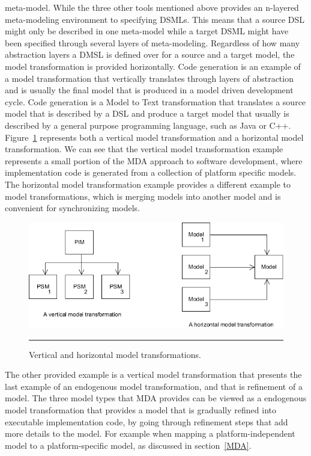 meta-model. While the three other tools mentioned above provides an n-layered
meta-modeling environment to specifying DSMLs. This means that a source DSL
might only be described in one meta-model while a target DSML might have been
specified through several layers of meta-modeling. Regardless of how many
abstraction layers a DMSL is defined over for a source and a target model, the
model transformation is provided horizontally. Code generation is an example of
a model transformation that vertically translates through layers of abstraction
and is usually the final model that is produced in a model driven development
cycle. Code generation is a Model to Text transformation that translates a
source model that is described by a DSL and produce a target model that usually
is described by a general purpose programming language, such as Java or C++.
Figure~\ref{fig:vertical_horizontal} represents both a vertical model
transformation and a horizontal model transformation. We can see that the
vertical model transformation example represents a small portion of the MDA
approach to software development, where implementation code is generated from a
collection of platform specific models. The horizontal model transformation
example provides a different example to model transformations, which is merging
models into another model and is convenient for synchronizing models.

\begin{figure}[H]
  \centering
    \includegraphics[scale=0.8]{./Figures/vertical_horizontal.png}
    \rule{35em}{0.5pt}
  \caption[Vertical and Horizontal model transformations]
  {Vertical and horizontal model transformations.}
  \label{fig:vertical_horizontal}
\end{figure}

The other provided example is a vertical model transformation that presents the
last example of an endogenous model transformation, and that is refinement of a
model. The three model types that MDA provides
can be viewed as a endogenous model transformation that provides a model that
is gradually refined into executable implementation code, by going through
refinement steps that add more details to the model. For example when mapping a
platform-independent model to a platform-specific model, as discussed in
section~\ref{MDA}. 

